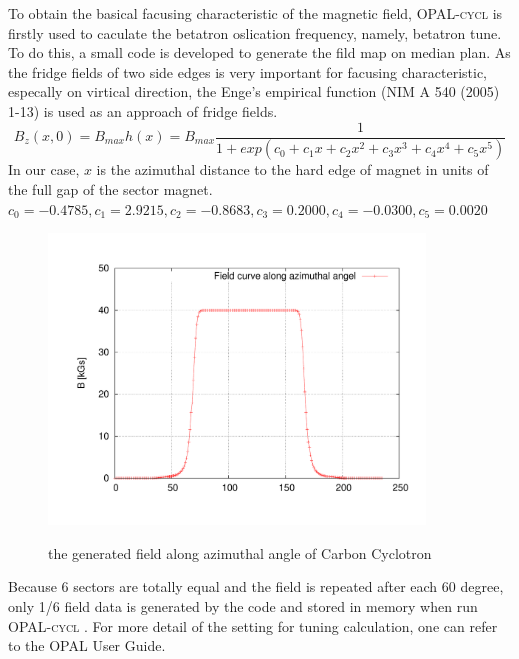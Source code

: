 \documentclass[12pt,a4paper]{report}
\newcommand{\opalcycl}{\textsc{OPAL-cycl }}
\begin{document}
To obtain the basical facusing characteristic of the magnetic field, \opalcycl  is firstly used to caculate the betatron oslication frequency, namely, betatron tune. 
To do this, a small code is developed to generate the fild map on median plan. As the fridge fields of two side edges is very important for facusing characteristic, 
especally on virtical direction, the Enge's empirical function (NIM A 540 (2005) 1-13) is used as an approach of fridge fields.
\begin{equation}
  \label{eq:fridgefiled}
  B_z(x,0)= B_{max}h(x) = B_{max}\frac{1}{1+exp(c_0 + c_1 x + c_2 x^2 + c_3 x^3 + c_4 x^4 + c_5 x^5)}
\end{equation}
In our case, $x$ is the azimuthal distance to the hard edge of magnet in units of the full gap of the sector magnet. 
$c_0=-0.4785, c_1=2.9215, c_2=-0.8683, c_3=0.2000, c_4=-0.0300, c_5=0.0020$
\begin{figure}[ht]
  \begin{center} 
    {\includegraphics[width=10cm]{fringeCurve.pdf}}
    \caption{the generated field along azimuthal angle of Carbon Cyclotron}
    \label{fig:fielcurve}
  \end{center}
\end{figure}
Because 6 sectors are totally equal and the field is repeated after each 60 degree, only 1/6 field data is generated by the code and stored in memory when run \opalcycl.
For more detail of the setting for tuning calculation, one can refer to the OPAL User Guide.
\end{document}
